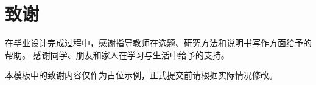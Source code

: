 \chapter{致谢}

在毕业设计完成过程中，感谢指导教师在选题、研究方法和说明书写作方面给予的帮助。
感谢同学、朋友和家人在学习与生活中给予的支持。

本模板中的致谢内容仅作为占位示例，正式提交前请根据实际情况修改。
